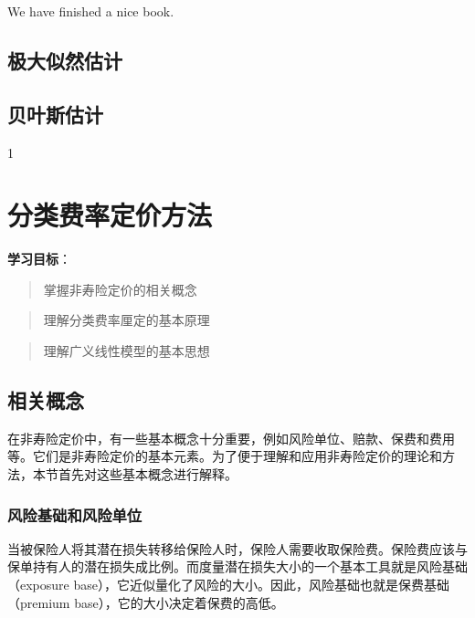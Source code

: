 \documentclass[
]{book}
\begin{document}
We have finished a nice book.

\hypertarget{ux6781ux5927ux4f3cux7136ux4f30ux8ba1}{%
\section{极大似然估计}\label{ux6781ux5927ux4f3cux7136ux4f30ux8ba1}}

\hypertarget{ux8d1dux53f6ux65afux4f30ux8ba1}{%
\section{贝叶斯估计}\label{ux8d1dux53f6ux65afux4f30ux8ba1}}

1

\hypertarget{classrating}{%
\chapter{分类费率定价方法}\label{classrating}}

\textbf{学习目标}：

\begin{quote}
掌握非寿险定价的相关概念
\end{quote}

\begin{quote}
理解分类费率厘定的基本原理
\end{quote}

\begin{quote}
理解广义线性模型的基本思想
\end{quote}

\hypertarget{ux76f8ux5173ux6982ux5ff5}{%
\section{相关概念}\label{ux76f8ux5173ux6982ux5ff5}}

在非寿险定价中，有一些基本概念十分重要，例如风险单位、赔款、保费和费用等。它们是非寿险定价的基本元素。为了便于理解和应用非寿险定价的理论和方法，本节首先对这些基本概念进行解释。

\hypertarget{ux98ceux9669ux57faux7840ux548cux98ceux9669ux5355ux4f4d}{%
\subsection{风险基础和风险单位}\label{ux98ceux9669ux57faux7840ux548cux98ceux9669ux5355ux4f4d}}

当被保险人将其潜在损失转移给保险人时，保险人需要收取保险费。保险费应该与保单持有人的潜在损失成比例。而度量潜在损失大小的一个基本工具就是风险基础（exposure base），它近似量化了风险的大小。因此，风险基础也就是保费基础（premium base），它的大小决定着保费的高低。
\end{document}
